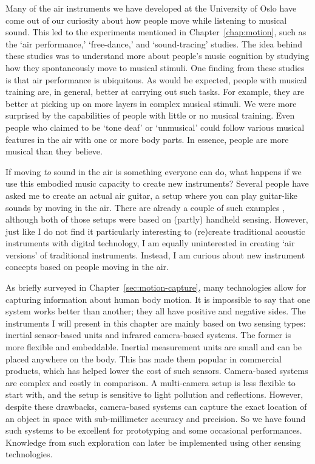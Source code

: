 Many of the air instruments we have developed at the University of Oslo have come out of our curiosity about how people move while listening to musical sound. This led to the experiments mentioned in Chapter~\ref{chap:motion}, such as the `air performance,' `free-dance,' and `sound-tracing' studies. The idea behind these studies was to understand more about people's music cognition by studying how they spontaneously move to musical stimuli. One finding from these studies is that air performance is ubiquitous. As would be expected, people with musical training are, in general, better at carrying out such tasks. For example, they are better at picking up on more layers in complex musical stimuli. We were more surprised by the capabilities of people with little or no musical training. Even people who claimed to be `tone deaf' or `unmusical' could follow various musical features in the air with one or more body parts. In essence, people are more musical than they believe.

If moving \emph{to} sound in the air is something everyone can do, what happens if we use this embodied music capacity to create new instruments? Several people have asked me to create an actual air guitar, a setup where you can play guitar-like sounds by moving in the air. There are already a couple of such examples \citep{karjalainen_virtual_2006,crawford_midi-airguitar_2009}, although both of those setups were based on (partly) handheld sensing. However, just like I do not find it particularly interesting to (re)create traditional acoustic instruments with digital technology, I am equally uninterested in creating `air versions' of traditional instruments. Instead, I am curious about new instrument concepts based on people moving in the air.

As briefly surveyed in Chapter~\ref{sec:motion-capture}, many technologies allow for capturing information about human body motion. It is impossible to say that one system works better than another; they all have positive and negative sides. The instruments I will present in this chapter are mainly based on two sensing types: inertial sensor-based units and infrared camera-based systems. The former is more flexible and embeddable. Inertial measurement units are small and can be placed anywhere on the body. This has made them popular in commercial products, which has helped lower the cost of such sensors. Camera-based systems are complex and costly in comparison. A multi-camera setup is less flexible to start with, and the setup is sensitive to light pollution and reflections. However, despite these drawbacks, camera-based systems can capture the exact location of an object in space with sub-millimeter accuracy and precision. So we have found such systems to be excellent for prototyping and some occasional performances. Knowledge from such exploration can later be implemented using other sensing technologies.

